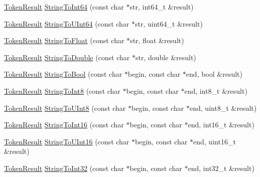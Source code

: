 \begin{DoxyCompactItemize}
\item 
\hyperlink{namespacemage_a2178ba2411db5912f41b2e7698c2037d}{Token\+Result} \hyperlink{namespacemage_a9134bbf3717893628e324fcf83e203a0}{String\+To\+Int64} (const char $\ast$str, int64\+\_\+t \&result)
\item 
\hyperlink{namespacemage_a2178ba2411db5912f41b2e7698c2037d}{Token\+Result} \hyperlink{namespacemage_a9ed31e3340a769a654f1f819c368bb6d}{String\+To\+U\+Int64} (const char $\ast$str, uint64\+\_\+t \&result)
\item 
\hyperlink{namespacemage_a2178ba2411db5912f41b2e7698c2037d}{Token\+Result} \hyperlink{namespacemage_a9353f738019573cfa93e504978bf6584}{String\+To\+Float} (const char $\ast$str, float \&result)
\item 
\hyperlink{namespacemage_a2178ba2411db5912f41b2e7698c2037d}{Token\+Result} \hyperlink{namespacemage_a49403be4dcbd136ffb13f62669576c50}{String\+To\+Double} (const char $\ast$str, double \&result)
\item 
\hyperlink{namespacemage_a2178ba2411db5912f41b2e7698c2037d}{Token\+Result} \hyperlink{namespacemage_a5deef7799d080b8c98c9ead54fbcb6db}{String\+To\+Bool} (const char $\ast$begin, const char $\ast$end, bool \&result)
\item 
\hyperlink{namespacemage_a2178ba2411db5912f41b2e7698c2037d}{Token\+Result} \hyperlink{namespacemage_a0bd81bf259563dd9de793ada42405c95}{String\+To\+Int8} (const char $\ast$begin, const char $\ast$end, int8\+\_\+t \&result)
\item 
\hyperlink{namespacemage_a2178ba2411db5912f41b2e7698c2037d}{Token\+Result} \hyperlink{namespacemage_ae6af1c0b282e0858fe4376325b4d06c6}{String\+To\+U\+Int8} (const char $\ast$begin, const char $\ast$end, uint8\+\_\+t \&result)
\item 
\hyperlink{namespacemage_a2178ba2411db5912f41b2e7698c2037d}{Token\+Result} \hyperlink{namespacemage_aa993ba23b5023902c29ecbe9b0d7a954}{String\+To\+Int16} (const char $\ast$begin, const char $\ast$end, int16\+\_\+t \&result)
\item 
\hyperlink{namespacemage_a2178ba2411db5912f41b2e7698c2037d}{Token\+Result} \hyperlink{namespacemage_a12bd34f17d7d39ac8d054be9293efe54}{String\+To\+U\+Int16} (const char $\ast$begin, const char $\ast$end, uint16\+\_\+t \&result)
\item 
\hyperlink{namespacemage_a2178ba2411db5912f41b2e7698c2037d}{Token\+Result} \hyperlink{namespacemage_a011b7977a7ae88795aac61e0e921bffe}{String\+To\+Int32} (const char $\ast$begin, const char $\ast$end, int32\+\_\+t \&result)

\end{DoxyCompactItemize}
